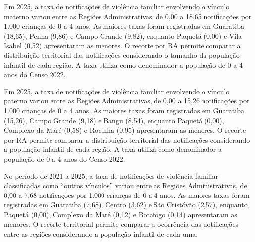 Em 2025, a taxa de notificações de violência familiar envolvendo o vínculo materno variou entre as Regiões Administrativas, de 0,00 a 18,65 notificações por 1.000 crianças de 0 a 4 anos. As maiores taxas foram registradas em Guaratiba (18,65), Penha (9,86) e Campo Grande (9,82), enquanto Paquetá (0,00) e Vila Isabel (0,52) apresentaram as menores. O recorte por RA permite comparar a distribuição territorial das notificações considerando o tamanho da população infantil de cada região. A taxa utiliza como denominador a população de 0 a 4 anos do Censo 2022.


Em 2025, a taxa de notificações de violência familiar envolvendo o vínculo paterno variou entre as Regiões Administrativas, de 0,00 a 15,26 notificações por 1.000 crianças de 0 a 4 anos. As maiores taxas foram registradas em Guaratiba (15,26), Campo Grande (9,18) e Bangu (8,54), enquanto Paquetá (0,00), Complexo da Maré (0,58) e Rocinha (0,95) apresentaram as menores. O recorte por RA permite comparar a distribuição territorial das notificações considerando a população infantil de cada região. A taxa utiliza como denominador a população de 0 a 4 anos do Censo 2022.


No período de 2021 a 2025, a taxa de notificações de violência familiar classificadas como “outros vínculos” variou entre as Regiões Administrativas, de 0,00 a 7,68 notificações por 1.000 crianças de 0 a 4 anos. As maiores taxas foram registradas em Guaratiba (7,68), Centro (3,62) e São Cristóvão (2,57), enquanto Paquetá (0,00), Complexo da Maré (0,12) e Botafogo (0,14) apresentaram as menores. O recorte territorial permite comparar a ocorrência das notificações entre as regiões considerando a população infantil de cada uma.

